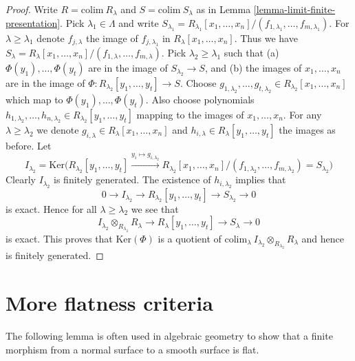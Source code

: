 \begin{proof}
Write $R = \text{colim}\ R_\lambda$ and $S = \text{colim}\ S_\lambda$
as in Lemma \ref{lemma-limit-finite-presentation}.
Pick $\lambda_1 \in \Lambda$ and write
$S_{\lambda_1} = R_{\lambda_1}[x_1,\ldots,x_n]/
(f_{1,\lambda_1},\ldots,f_{m,\lambda_1})$. For $\lambda \geq \lambda_1$
denote $f_{j, \lambda}$ the image of $f_{j, \lambda_1}$ in
$R_\lambda[x_1,\ldots,x_n]$. Thus we have
$S_{\lambda} = R_{\lambda}[x_1,\ldots,x_n]/
(f_{1,\lambda},\ldots,f_{m,\lambda})$. Pick $\lambda_2 \geq \lambda_1$
such that (a) $\Phi(y_1),\ldots,\Phi(y_t)$ are in the image of
$S_{\lambda_2} \to S$, and (b) the images of $x_1,\ldots,x_n$
are in the image of $\Phi : R_{\lambda_2}[y_1,\ldots,y_t] \to S$.
Choose $g_{1,\lambda_2},\ldots,g_{t, \lambda_2} \in 
R_{\lambda_2}[x_1,\ldots,x_n]$ which map to $\Phi(y_1),\ldots,\Phi(y_t)$.
Also choose polynomials
$h_{1,\lambda_2},\ldots, h_{n,\lambda_2} \in R_{\lambda_2}[y_1,\ldots,y_t]$
mapping to the images of $x_1,\ldots,x_n$.
For any $\lambda \geq \lambda_2$ we denote 
$g_{i, \lambda} \in R_{\lambda}[x_1,\ldots,x_n]$
and
$h_{i, \lambda} \in R_{\lambda}[y_1,\ldots,y_t]$
the images as before. Let
$$
I_{\lambda_2} = \text{Ker}\Big(
R_{\lambda_2}[y_1,\ldots,y_t]
\xrightarrow{y_i \mapsto g_{i, \lambda_2}}
R_{\lambda_2}[x_1,\ldots,x_n]/(f_{1,\lambda_2},\ldots,f_{m,\lambda_2})
= S_{\lambda_2}
\Big)
$$
Clearly $I_{\lambda_2}$ is finitely generated. The existence of
$h_{i, \lambda_2}$ implies that 
$$
0 \to I_{\lambda_2} \to R_{\lambda_2}[y_1,\ldots,y_t]
\to S_{\lambda_2} \to 0
$$
is exact. Hence for all $\lambda \geq \lambda_2$ we see
that
$$
I_{\lambda_2} \otimes_{R_{\lambda_2}} R_\lambda
\to 
R_{\lambda}[y_1,\ldots,y_t]
\to S_{\lambda} \to 0
$$
is exact. This proves that $\text{Ker}(\Phi)$
is a quotient of
$\text{colim}_\lambda\ I_{\lambda_2} \otimes_{R_{\lambda_2}} R_\lambda$
and hence is finitely generated.
\end{proof}













\section{More flatness criteria}
\label{section-more-flatness-criteria}

\noindent
The following lemma is often used in algebraic geometry to show that a finite
morphism from a normal surface to a smooth surface is flat.

